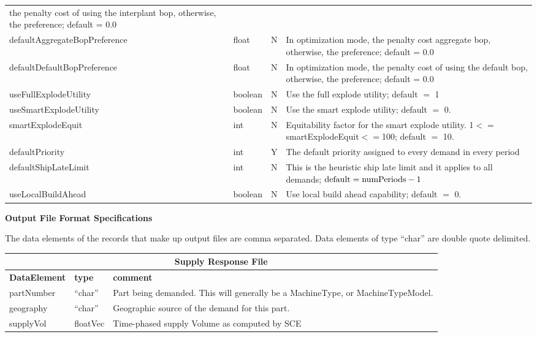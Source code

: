 \begin{tabular}{lllp{3in}}
                                        the penalty cost of using the
                                        interplant bop, otherwise, the preference;
                                        default = 0.0 \\
defaultAggregateBopPreference & float & N & In optimization mode,
                                        the penalty cost aggregate bop, otherwise,
                                        the preference; default = 0.0 \\
defaultDefaultBopPreference & float & N & In optimization mode, the
                                        penalty cost of using the default bop,
                                        otherwise, the preference; default = 0.0 \\
useFullExplodeUtility & boolean & N & Use the full explode utility; default $=$ 1 \\
useSmartExplodeUtility & boolean & N & Use the smart explode utility;
default $=$ 0. \\
smartExplodeEquit & int & N & Equitability factor for the smart
explode utility. 1$<=$smartExplodeEquit$<=$100;
default $=$ 10. \\

defaultPriority & int & Y & The default priority assigned to every demand
      in every period \\
defaultShipLateLimit & int & N & This is the heuristic ship late limit and
   it applies to all demands;  ${\rm default} = {\rm numPeriods} - 1$\\
useLocalBuildAhead & boolean & N & Use local build ahead capability; default $=$ 0.\\

\end{tabular}

\clearpage
\noindent
{\bf Output File Format Specifications}

The data elements of the records that make up output files are comma 
separated.  Data elements of type ``char'' are double quote delimited. 

\begin{tabular}{llp{4in}}
\multicolumn{3}{c}{{\bf Supply Response File}}\\ \hline\hline
{\bf DataElement} &  {\bf type}  &   {\bf comment} \\ \hline
partNumber  & ``char'' &     Part being demanded.  This will generally be a
                       MachineType, or MachineTypeModel. \\
geography   & ``char''  &    Geographic source of the demand for this part. \\
supplyVol   & floatVec&  Time-phased supply Volume as computed by SCE \\
\end{tabular}

